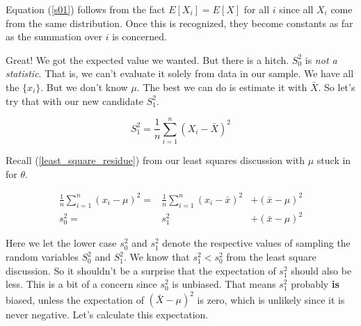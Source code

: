 \documentclass[]{article}
\begin{document}
Equation (\ref{s01}) follows from the fact $E[X_i] = E[X]$ 
for all $i$ since
all $X_i$ come from the same distribution.  Once this is recognized,
they become constants as far as the summation over $i$ is concerned.

Great!  We got the expected value we wanted.  But there is a hitch.
$S_0^2$ is \emph{not a statistic}.  That is, we can't evaluate it
solely from data in our sample.  We have all the $\{x_i\}$.  But
we don't know $\mu$.  The best we can do is estimate it with
$\bar{X}$.  So let's try that with our new candidate $S_1^2$.

\begin{equation} \label{s1}
S_1^2 = \frac{1}{n} \sum_{i=1}^n (X_i - \bar{X})^2
\end{equation}

Recall (\ref{least_square_residue}) from our least squares
discussion with $\mu$ stuck in for $\theta$.

\begin{eqnarray}
\frac{1}{n} \sum_{i=1}^n (x_i - \mu)^2
  = & \frac{1}{n} \sum_{i=1}^n (x_i - \bar{x})^2 & +
  (\bar{x} - \mu)^2  \nonumber \\
s_0^2 = & s_1^2 & + (\bar{x} - \mu)^2 \label{var_diff}
\end{eqnarray}

Here we let the lower case $s_0^2$ and $s_1^2$ denote the respective
values of sampling the random variables $S_0^2$ and $S_1^2$.
We know that $s_1^2 < s_0^2$ from the least square discussion.
So it shouldn't be a surprise that the expectation of $s_1^2$
should also be less.  This is a bit of a concern since 
$s_0^2$ is unbiased.  That means $s_1^2$ probably \textbf{is} biased,
unless the expectation of $(\bar{X} - \mu)^2$ is zero, which
is unlikely since it is never negative.  Let's calculate
this expectation.
\end{document}
